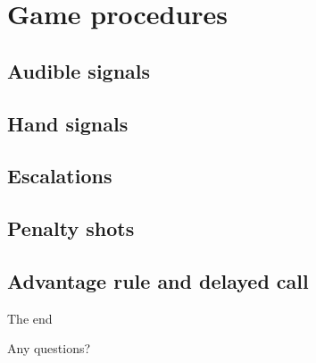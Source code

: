 \documentclass{beamer}
\begin{document}


\section{Game procedures}

\subsection{Audible signals}



\subsection{Hand signals}



\subsection{Escalations}



\subsection{Penalty shots}



\subsection{Advantage rule and delayed call}



\begin{frame}{The end}
    \begin{center}
        Any questions?
    \end{center}
\end{frame}
\end{document}
